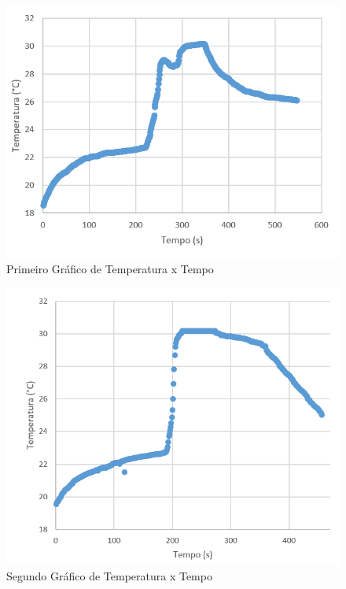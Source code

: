 \documentclass[14pt, oneside]{book}
\theoremstyle{definition}
\begin{document}
			    \begin{figure}[H]
                        \centering
                        \includegraphics[scale = 1]{1medida_temperatura_x_tempo.PNG}
                        \caption{Primeiro Gráfico de Temperatura x Tempo}
                        \label{primeiro}
                    \end{figure}
                    
                \begin{figure}[H]
                        \centering
                        \includegraphics[scale = 1]{2medida_temperatura_x_tempo_certo.PNG}
                        \caption{Segundo Gráfico de Temperatura x Tempo}
                        \label{segundo}
                    \end{figure}
                
\end{document}
